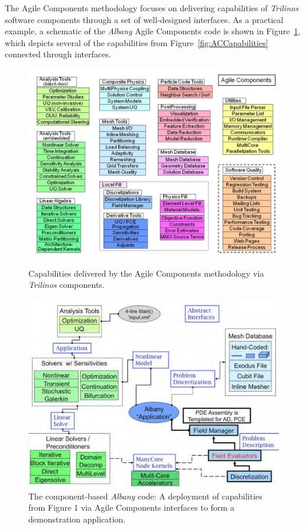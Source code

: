 \documentclass[10pt]{article}
\theoremstyle{plain}
\theoremstyle{definition}
\theoremstyle{remark}
\numberwithin{equation}{section}
\begin{document}
The Agile Components methodology focuses on delivering capabilities of \emph{Trilinos} software components through a set of well-designed interfaces. As a practical example, a schematic of the \emph{Albany} Agile Components code is shown in Figure~\ref{fig:ACAlbany}, which depicts several of the capabilities from Figure~\ref{fig:ACCapabilities} connected through interfaces.
\begin{figure}[htbp]
  \begin{center}
  \begin{minipage}[b]{0.8\linewidth}
    \centering
    \includegraphics[width=\linewidth]{AgileComponents1}
    \caption{Capabilities delivered by the Agile Components methodology via \emph{Trilinos} components.}
    \label{fig:ACCapabilities}
  \end{minipage}
  \begin{minipage}[b]{0.8\linewidth}
    \centering
    \includegraphics[width=\linewidth]{AgileComponents2}
    \caption{The component-based \emph{Albany} code: A deployment of capabilities from Figure 1 via Agile Components interfaces to form a demonstration application.}
    \label{fig:ACAlbany}
  \end{minipage}
  \end{center}
\end{figure}
\end{document}
